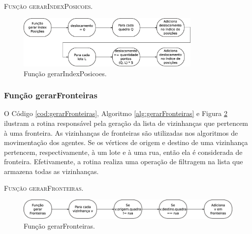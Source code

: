 

\begin{algorithm}[H]
   \SetAlgoLined   
   
   \caption{\textsc{Função gerarIndexPosicoes.}}
   \label{alg:gerarIndexPosicoes}
\end{algorithm}

\begin{figure}[H]
  \centering
  \includegraphics[width=0.8\textwidth]{Figuras/Simula/Fluxos/gerarIndexPosicoes.eps}
  \caption{Função gerarIndexPosicoes.}
  \label{fig:gerarIndexPosicoes}
\end{figure} 

\newpage

\subsubsection{Função gerarFronteiras}

O Código \ref{cod:gerarFronteiras}, Algoritmo \ref{alg:gerarFronteiras} e Figura \ref{fig:gerarFronteiras} ilustram a rotina responsável pela geração da lista de vizinhanças que pertencem à uma fronteira. As vizinhanças de fronteiras são utilizadas nos algoritmos de movimentação dos agentes. Se os vértices de origem e destino de uma vizinhança pertencem, respectivamente, à um lote e à uma rua, então ela é considerada de fronteira. Efetivamente, a rotina realiza uma operação de filtragem na lista que armazena todas as vizinhanças. 



\begin{algorithm}[H]
   \SetAlgoLined   
   
   \caption{\textsc{Função gerarFronteiras.}}
   \label{alg:gerarFronteiras}
\end{algorithm}

\begin{figure}[H]
  \centering
  \includegraphics[width=1\textwidth]{Figuras/Simula/Fluxos/gerarFronteiras.eps}
  \caption{Função gerarFronteiras.}
  \label{fig:gerarFronteiras}
\end{figure} 

